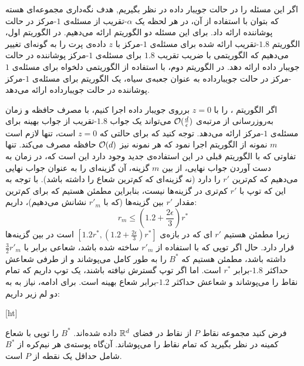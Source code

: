 
اگر این مسئله را در حالت جویبار داده در نظر بگیریم, هدف نگه‌داری مجموعه‌ای هسته که بتوان با استفاده از آن، در هر لحظه یک $\alpha$-تقریب از مسئله‌ی $1$-مرکز در حالت پوشاننده ارائه داد. برای این مسئله دو الگوریتم ارائه می‌دهیم. در الگوریتم اول، الگوریتم $1.8$-تقریب ارائه شده برای مسئله‌ی $1$-مرکز با $z$ داده‌ی پرت را به گونه‌ای تغییر می‌دهیم که الگوریتمی با ضریب تقریب $1.8$ برای مسئله‌ی $1$-مرکز پوشاننده در حالت جویبار داده ارائه دهد. در الگوریتم دوم، با استفاده از الگوریتمی دلخواه برای  مسئله‌ی $1$-مرکز در حالت جویبارداده به عنوان جعبه‌ی سیاه، یک الگوریتم برای مسئله‌ی $1$-مرکز پوشاننده در حالت جویبارداده ارائه می‌دهد.


اگر الگوریتم ، را با $z=0$ برروی جویبار داده اجرا کنیم، با مصرف حافظه‌ و زمان به‌روزرسانی از مرتبه‌ی $\mathcal{O}(\frac{d}{\epsilon})$ می‌تواند یک جواب $1.8$-تقریب از جواب بهینه برای مسئله‌ی $1$-مرکز ارائه می‌دهد. توجه کنید که برای حالتی که $z=0$ است، تنها لازم است $m$ نمونه از الگوریتم اجرا نمود که هر نمونه نیز $\mathcal{O}(d)$ حافظه مصرف می‌کند. تنها تفاوتی که با الگوریتم قبلی در این استفاده‌ی جدید وجود دارد این است که، در زمان به‌ دست آوردن جواب نهایی، از بین $m$ گزینه، آن گزینه‌ای را به عنوان جواب نهایی می‌دهیم که کم‌ترین $r'$ را دارد (نه گزینه‌ای که کم‌ترین  شعاع را داشته باشد). با توجه به این که توپ با $r'$ کم‌تری در گزینه‌ها نیست، بنابراین مطمئن هستیم که برای کم‌ترین مقدار $r'$ بین گزینه‌ها (که با $r'_m$ نشانش می‌دهیم)، داریم:
$$r_m \leq (1.2 + \frac{2\epsilon}{3})r^*$$
زیرا مطمئن هستیم $r'$ ای که در بازه‌ی $[1.2r^*, (1.2 + \frac{2\epsilon}{3})r^*]$ است در بین گزینه‌ها قرار دارد. حال اگر توپی که با استفاده از $r'_m$ ساخته شده باشد، شعاعی برابر با $\frac{3}{2}r'_m$ داشته باشد، مطمئن هستیم که $B^*$ را به طور کامل می‌پوشاند و از طرفی شعاعش حداکثر $1.8$-برابر $r^*$ است. اما اگر توپ گسترش نیافته باشند، یک توپ داریم که تمام نقاط را می‌پوشاند و شعاعش حداکثر $1.2$-برابر شعاع بهینه است. برای ادامه‌، نیاز به به دو لم زیر داریم:


[ht]


فرض کنید مجموعه نقاط $P$ از نقاط در فضای $\mathbb{R}^d$ داده شده‌اند. $B^*$ را توپی با شعاع کمینه در نظر بگیرید که تمام نقاط را می‌پوشاند. آن‌گاه پوسته‌ی هر نیم‌‌کره از $B^*$ شامل حداقل یک نقطه از $P$ است.

